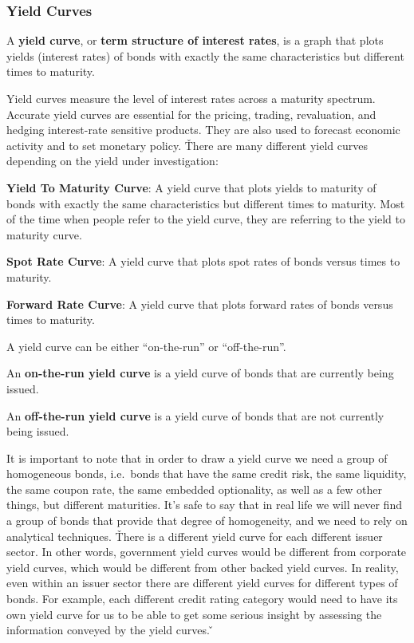 \subsubsection{Yield Curves}

A \textbf{yield curve}, or \textbf{term structure of interest rates}, is a graph that plots yields (interest rates) of
bonds with exactly the same characteristics but different times to maturity.
\ed


Yield curves measure the level of interest rates across a maturity spectrum. Accurate yield curves are essential for
the pricing, trading, revaluation, and hedging interest-rate sensitive products. They are also used to forecast
economic activity and to set monetary policy. \v

There are many different yield curves depending on the yield under investigation:
\bit
\item \textbf{Yield To Maturity Curve}: A yield curve that plots yields to maturity of bonds with exactly the same
characteristics but different times to maturity. Most of the time when people refer to the yield curve, they are
referring to the yield to maturity curve.
\item \textbf{Spot Rate Curve}: A yield curve that plots spot rates of bonds versus times to maturity.
\item \textbf{Forward Rate Curve}: A yield curve that plots forward rates of bonds versus times to maturity.
\eit

A yield curve can be either ``on-the-run'' or ``off-the-run''.

An \textbf{on-the-run yield curve} is a yield curve of bonds that are currently being issued.
\ed

An \textbf{off-the-run yield curve} is a yield curve of bonds that are not currently being issued.
\ed

It is important to note that in order to draw a yield curve we need a group of homogeneous bonds, i.e.\ bonds that
have the same credit risk, the same liquidity, the same coupon rate, the same embedded optionality, as well as a few
other things, but different maturities. It's safe to say that in real life we will never find a group of bonds that
provide that degree of homogeneity, and we need to rely on analytical techniques. \v

There is a different yield curve for each different issuer sector. In other words, government yield curves would be
different from corporate yield curves, which would be different from other backed yield curves. In reality, even within
an issuer sector there are different yield curves for different types of bonds. For example, each different credit
rating category would need to have its own yield curve for us to be able to get some serious insight by assessing the
information conveyed by the yield curves. \v

